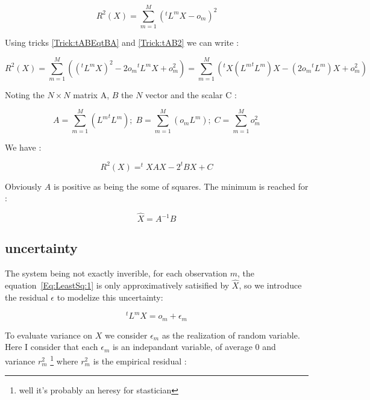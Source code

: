 \begin{equation}
    R^2(X) = \sum\limits_{m=1}^M ( ^tL^m   X - o_m) ^2  
\end{equation}

Using tricks \ref{Trick:tABEqtBA} and \ref{Trick:tAB2} we can write :

\begin{equation}
    R^2(X) = \sum\limits_{m=1}^M  ( (^tL^m   X)^2 - 2 o_m {^tL^m} X + o_m ^ 2) 
           = \sum\limits_{m=1}^M  ( {^t X ({L^m} ^t{L^m}) X} - (2 o_m {^tL^m} )X + o_m ^2)
\end{equation}


Noting the $N \times N$ matrix A, $B$ the $N$ vector and the scalar C :

\begin{equation}
           A = \sum\limits_{m=1}^M { ({L^m} ^t{L^m}) } 
       ;\; B = \sum\limits_{m=1}^M  ( o_m {L^m} ) 
       ;\; C = \sum\limits_{m=1}^M  o_m ^2
\end{equation}

We have :

\begin{equation}
    R^2(X) = ^t X A X - 2^t B X + C
\end{equation}

Obviously $A$ is positive as being the some of squares. The minimum is reached for :

\begin{equation}
     \hat{X}  =  A^{-1} B
\end{equation}

\subsection{uncertainty}

The system being not exactly inverible, for each observation $m$,  
the equation~\ref{Eq:LeastSq:1} is only approximatively satisified by $\hat{X}$,
so we introduce the  residual $\epsilon$  to modelize this uncertainty:

\begin{equation}
     ^tL^m X = o_m + {\epsilon}_m
\end{equation}

To evaluate variance on $X$ we consider  ${\epsilon}_m$  as the realization of random variable. Here I consider that 
each ${\epsilon}_m$ is an indepandant variable, of average $0$ and variance $r_m^2$ \footnote{well  it's probably an heresy
for stastician} where $r_m^2$ is the empirical residual :


